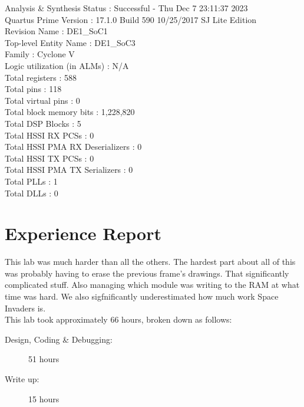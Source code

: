 \documentclass[11pt, titlepage]{article}
\begin{document}
            Analysis \& Synthesis Status : Successful - Thu Dec  7 23:11:37 2023 \\
            Quartus Prime Version : 17.1.0 Build 590 10/25/2017 SJ Lite Edition \\
            Revision Name : DE1\_SoC1 \\
            Top-level Entity Name : DE1\_SoC3 \\
            Family : Cyclone V \\
            Logic utilization (in ALMs) : N/A \\
            Total registers : 588 \\
            Total pins : 118 \\
            Total virtual pins : 0 \\
            Total block memory bits : 1,228,820 \\
            Total DSP Blocks : 5 \\
            Total HSSI RX PCSs : 0 \\
            Total HSSI PMA RX Deserializers : 0 \\
            Total HSSI TX PCSs : 0 \\
            Total HSSI PMA TX Serializers : 0 \\
            Total PLLs : 1 \\
            Total DLLs : 0 \\
            
    \newpage
    \section{Experience Report}
        This lab was much harder than all the others. The hardest part about all of this was probably having to erase the previous frame's drawings. That significantly complicated stuff. Also managing which module was writing to the RAM at what time was hard. We also sigfnificantly underestimated how much work Space Invaders is. \\

        This lab took approximately 66 hours, broken down as follows:
        \begin{description}
            \item[Design, Coding \& Debugging:] 51 hours
            \item[Write up:] 15 hours
        \end{description}   
        
\end{document}
